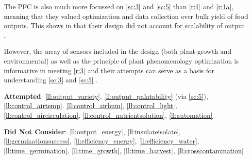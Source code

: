 The PFC is also much more focussed on \ref{sc:3} and \ref{sc:5} than \ref{r:1} and \ref{r:1a}, meaning that they valued optimization and data collection over bulk yield of food outputs. This shows in that their design did not account for scalability of output \cite{mit-wfp}.

However, the array of sensors included in the design (both plant-growth and environmental) as well as the principle of plant phenomenology optimization is informative in meeting \ref{r:3} and their attempts can serve as a basis for understanding \ref{sc:3} and \ref{sc:5} \cite{mit-openag}.

\textbf{Attempted}: \ref{ll:output_variety}, \ref{ll:output_palatability} (via \ref{sc:5}), \ref{ll:control_airtemp}. \ref{ll:control_airhum}, \ref{ll:control_light}, \ref{ll:control_aircirculation}, \ref{ll:control_nutrientsolution}, \ref{ll:automation}

\textbf{Did Not Consider}: \ref{ll:output_energy}, \ref{ll:insulateisolate}, \ref{ll:germinationsuccess}, \ref{ll:efficiency_energy}, \ref{ll:efficiency_water}, \ref{ll:time_germination}, \ref{ll:time_growth}, \ref{ll:time_harvest}, \ref{ll:crosscontamination}
